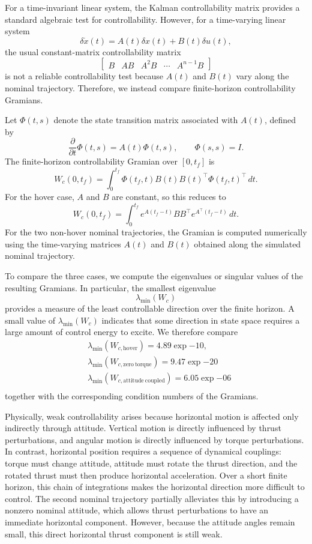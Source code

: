 For a time-invariant linear system, the Kalman controllability matrix provides a standard algebraic test for controllability. However, for a time-varying linear system
\[
    \delta\dot x(t)=A(t)\delta x(t)+B(t)\delta u(t),
\]
the usual constant-matrix controllability matrix
\[
    \begin{bmatrix}
        B & AB & A^2B & \cdots & A^{n-1}B
    \end{bmatrix}
\]
is not a reliable controllability test because \(A(t)\) and \(B(t)\) vary along the nominal trajectory. Therefore, we instead compare finite-horizon controllability Gramians.

Let \(\Phi(t,s)\) denote the state transition matrix associated with \(A(t)\), defined by
\[
    \frac{\partial}{\partial t}\Phi(t,s)
    =
    A(t)\Phi(t,s),
    \qquad
    \Phi(s,s)=I.
\]
The finite-horizon controllability Gramian over \([0,t_f]\) is
\[
    W_c(0,t_f)
    =
    \int_0^{t_f}
    \Phi(t_f,t)B(t)B(t)^{\top}\Phi(t_f,t)^{\top}\,dt.
\]
For the hover case, \(A\) and \(B\) are constant, so this reduces to
\[
    W_c(0,t_f)
    =
    \int_0^{t_f}
    e^{A(t_f-t)}BB^{\top}e^{A^{\top}(t_f-t)}\,dt.
\]
For the two non-hover nominal trajectories, the Gramian is computed numerically using the time-varying matrices \(A(t)\) and \(B(t)\) obtained along the simulated nominal trajectory.

To compare the three cases, we compute the eigenvalues or singular values of the resulting Gramians. In particular, the smallest eigenvalue
\[
    \lambda_{\min}(W_c)
\]
provides a measure of the least controllable direction over the finite horizon. A small value of \(\lambda_{\min}(W_c)\) indicates that some direction in state space requires a large amount of control energy to excite. We therefore compare
\begin{equation}
\begin{aligned}
    &\lambda_{\min}(W_{c,\mathrm{hover}}) = 4.89 \exp{-10}, \\
    &\lambda_{\min}(W_{c,\mathrm{zero\ torque}}) = 9.47 \exp{-20}\\
    &\lambda_{\min}(W_{c,\mathrm{attitude\ coupled}}) = 6.05 \exp{-06}\\
\end{aligned}
\end{equation}
together with the corresponding condition numbers of the Gramians.

Physically, weak controllability arises because horizontal motion is affected only indirectly through attitude. Vertical motion is directly influenced by thrust perturbations, and angular motion is directly influenced by torque perturbations. In contrast, horizontal position requires a sequence of dynamical couplings: torque must change attitude, attitude must rotate the thrust direction, and the rotated thrust must then produce horizontal acceleration. Over a short finite horizon, this chain of integrations makes the horizontal direction more difficult to control. The second nominal trajectory partially alleviates this by introducing a nonzero nominal attitude, which allows thrust perturbations to have an immediate horizontal component. However, because the attitude angles remain small, this direct horizontal thrust component is still weak.

